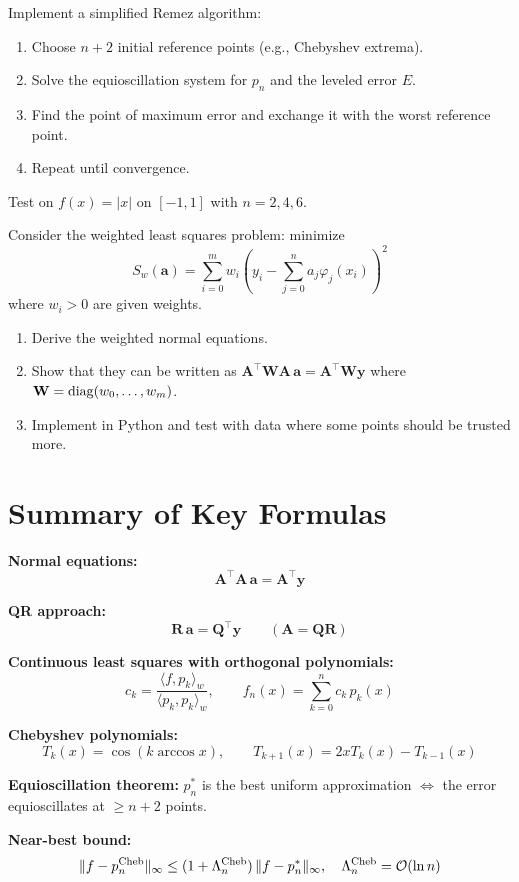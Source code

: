 \begin{exercise}[$\star\star\star$]
\label{ex:ch6-remez}
Implement a simplified Remez algorithm:
\begin{enumerate}
    \item Choose $n+2$ initial reference points (e.g., Chebyshev extrema).
    \item Solve the equioscillation system for $p_n$ and the leveled error $E$.
    \item Find the point of maximum error and exchange it with the worst reference point.
    \item Repeat until convergence.
\end{enumerate}
Test on $f(x) = |x|$ on $[-1,1]$ with $n = 2, 4, 6$.
\end{exercise}

\begin{exercise}[$\star\star\star$]
\label{ex:ch6-weighted-ls}
Consider the weighted least squares problem: minimize
\[
    S_w(\mathbf{a}) = \sum_{i=0}^{m} w_i \left(y_i - \sum_{j=0}^{n} a_j \varphi_j(x_i)\right)^2
\]
where $w_i > 0$ are given weights.
\begin{enumerate}
    \item Derive the weighted normal equations.
    \item Show that they can be written as $\mathbf{A}^\top\mathbf{W}\mathbf{A}\,\mathbf{a} = \mathbf{A}^\top\mathbf{W}\mathbf{y}$ where $\mathbf{W} = \operatorname{diag}(w_0, \ldots, w_m)$.
    \item Implement in Python and test with data where some points should be trusted more.
\end{enumerate}
\end{exercise}

\section*{Summary of Key Formulas}

\begin{keyformulas}
\textbf{Normal equations:}
\[
    \mathbf{A}^\top \mathbf{A} \, \mathbf{a} = \mathbf{A}^\top \mathbf{y}
\]

\textbf{QR approach:}
\[
    \mathbf{R}\,\mathbf{a} = \mathbf{Q}^\top\mathbf{y} \qquad (\mathbf{A} = \mathbf{Q}\mathbf{R})
\]

\textbf{Continuous least squares with orthogonal polynomials:}
\[
    c_k = \frac{\langle f, p_k \rangle_w}{\langle p_k, p_k \rangle_w}, \qquad f_n(x) = \sum_{k=0}^{n} c_k\, p_k(x)
\]

\textbf{Chebyshev polynomials:}
\[
    T_k(x) = \cos(k\arccos x), \qquad T_{k+1}(x) = 2xT_k(x) - T_{k-1}(x)
\]

\textbf{Equioscillation theorem:} $p_n^*$ is the best uniform approximation $\iff$ the error equioscillates at $\geq n+2$ points.

\textbf{Near-best bound:}
\[
    \|f - p_n^{\mathrm{Cheb}}\|_\infty \leq (1 + \Lambda_n^{\mathrm{Cheb}}) \, \|f - p_n^*\|_\infty, \quad \Lambda_n^{\mathrm{Cheb}} = \mathcal{O}(\ln n)
\]
\end{keyformulas}
